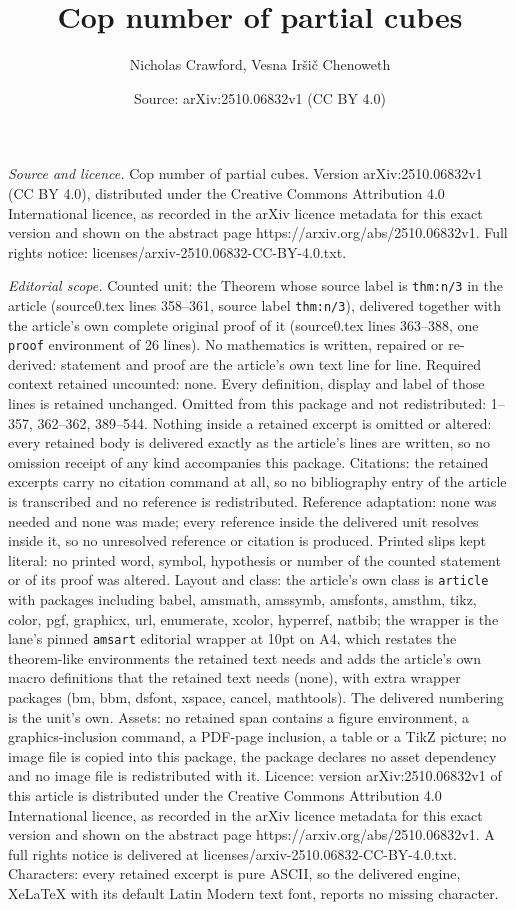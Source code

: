 \documentclass[10pt,a4paper]{amsart}
\title[Cop number of partial cubes]{Cop number of partial cubes}
\author{Nicholas Crawford, Vesna Ir\v{s}i\v{c} Chenoweth}
\date{Source: arXiv:2510.06832v1 (CC BY 4.0)}
\begin{document}
\maketitle

\noindent\emph{Source and licence.} Cop number of partial cubes. Version arXiv:2510.06832v1 (CC BY 4.0), distributed under the Creative Commons Attribution 4.0 International licence, as recorded in the arXiv licence metadata for this exact version and shown on the abstract page https://arxiv.org/abs/2510.06832v1. Full rights notice: licenses/arxiv-2510.06832-CC-BY-4.0.txt.\par\smallskip

\noindent\textit{Editorial scope.} Counted unit: the Theorem whose source label is \texttt{thm:n/3} in the article (source0.tex lines 358--361, source label \texttt{thm:n/3}), delivered together with the article's own complete original proof of it (source0.tex lines 363--388, one \texttt{proof} environment of 26 lines). No mathematics is written, repaired or re-derived: statement and proof are the article's own text line for line. Required context retained uncounted: none. Every definition, display and label of those lines is retained unchanged. Omitted from this package and not redistributed: 1--357, 362--362, 389--544. Nothing inside a retained excerpt is omitted or altered: every retained body is delivered exactly as the article's lines are written, so no omission receipt of any kind accompanies this package. Citations: the retained excerpts carry no citation command at all, so no bibliography entry of the article is transcribed and no reference is redistributed. Reference adaptation: none was needed and none was made; every reference inside the delivered unit resolves inside it, so no unresolved reference or citation is produced. Printed slips kept literal: no printed word, symbol, hypothesis or number of the counted statement or of its proof was altered. Layout and class: the article's own class is \texttt{article} with packages including babel, amsmath, amssymb, amsfonts, amsthm, tikz, color, pgf, graphicx, url, enumerate, xcolor, hyperref, natbib; the wrapper is the lane's pinned \texttt{amsart} editorial wrapper at 10pt on A4, which restates the theorem-like environments the retained text needs and adds the article's own macro definitions that the retained text needs (none), with extra wrapper packages (bm, bbm, dsfont, xspace, cancel, mathtools). The delivered numbering is the unit's own. Assets: no retained span contains a figure environment, a graphics-inclusion command, a PDF-page inclusion, a table or a TikZ picture; no image file is copied into this package, the package declares no asset dependency and no image file is redistributed with it. Licence: version arXiv:2510.06832v1 of this article is distributed under the Creative Commons Attribution 4.0 International licence, as recorded in the arXiv licence metadata for this exact version and shown on the abstract page https://arxiv.org/abs/2510.06832v1. A full rights notice is delivered at licenses/arxiv-2510.06832-CC-BY-4.0.txt. Characters: every retained excerpt is pure ASCII, so the delivered engine, XeLaTeX with its default Latin Modern text font, reports no missing character.
\end{document}
